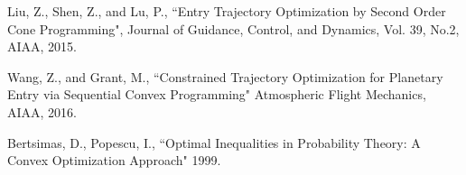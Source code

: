 \documentclass[10pt,a4paper]{article}
\begin{document}
%	
%	
%	
	
	
	\begin{thebibliography}{1}
	Liu, Z., Shen, Z., and Lu, P., ``Entry Trajectory Optimization by Second Order Cone Programming", Journal of Guidance, Control, and Dynamics, Vol. 39, No.2,  AIAA, 2015.
	
	Wang, Z., and Grant, M., ``Constrained Trajectory Optimization for Planetary Entry via Sequential Convex Programming" Atmospheric Flight Mechanics, AIAA, 2016. 
	
	Bertsimas, D., Popescu, I., ``Optimal Inequalities in Probability Theory: A Convex Optimization Approach" 1999.
	\end{thebibliography}
\end{document}
